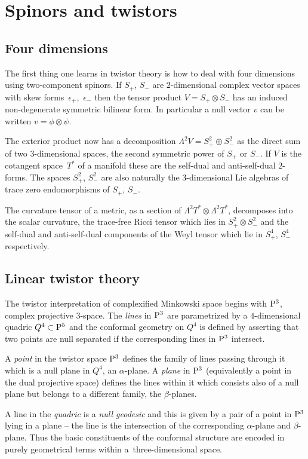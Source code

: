 \documentclass[10pt,a4paper]{amsart}
\numberwithin{equation}{section}
\begin{document}
\section{Spinors and twistors}
\subsection{Four dimensions}\label{four}
The first thing one learns in twistor theory is how to deal with four dimensions using two-component spinors. If $S_+$, $S_-$ are $2$-dimensional complex vector spaces with skew forms~$\epsilon_+$,~$\epsilon_-$ then the tensor product $V=S_+\otimes S_-$ has an induced non-degenerate symmetric bilinear form. In particular a null vector $v$ can be written $v=\phi\otimes \psi$.

The exterior product now has a decomposition
$\Lambda^2V=S_+^2\oplus S_-^2$ as the direct sum of two $3$-dimensional spaces, the second symmetric power of $S_+$ or $S_-$. If $V$ is the cotangent space~$T^*$ of a manifold these are the self-dual and anti-self-dual $2$-forms. The spaces $S^2_+$, $S^2_-$ are also naturally the $3$-dimensional Lie algebras of trace zero endomorphisms of $S_+$, $S_-$.

The curvature tensor of a metric, as a section of $\Lambda^2T^*\otimes \Lambda^2T^*$, decomposes into the scalar curvature, the trace-free Ricci tensor which lies in $S^2_+\otimes S^2_-$ and the self-dual and anti-self-dual components of the Weyl tensor which lie in $S^4_+$, $S^4_-$ respectively.

\subsection{Linear twistor theory}
The twistor interpretation of complexified Minkowski space begins with ${\rm P}^3$, complex projective $3$-space. The {\it lines} in ${\rm P}^3$ are parametrized by a $4$-dimensional quadric $Q^4\subset{\rm P}^5$ and the conformal geometry on $Q^4$ is defined by asserting that two points are null separated if the corresponding lines in ${\rm P}^3$ intersect.

A {\it point} in the twistor space ${\rm P}^3$ defines the family of lines passing through it which is a null plane in $Q^4$, an $\alpha$-plane. A {\it plane} in ${\rm P}^3$ (equivalently a point in the dual projective space) defines the lines within it which consists also of a null plane but belongs to a different family, the $\beta$-planes.

A line in the {\it quadric} is a {\it null geodesic} and this is given by a pair of a point in ${\rm P}^3$ lying in a plane -- the line is the intersection of the corresponding $\alpha$-plane and $\beta$-plane. Thus the basic constituents of the conformal structure are encoded in purely geometrical terms within a~three-dimensional space.
\end{document}

